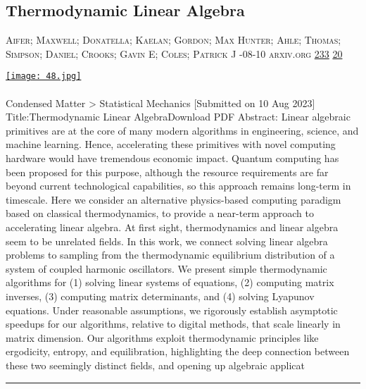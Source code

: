 \documentclass[10pt,a4paper]{article}
\begin{document}
\begin{multicols}{2}
\begin{minipage}{\linewidth}
\subsection{Thermodynamic Linear Algebra}
\textsc{\footnotesize
{\scriptsize\faUser}\space 
Aifer; Maxwell; Donatella; Kaelan; Gordon; Max Hunter; Ahle; Thomas; Simpson; Daniel; Crooks; Gavin E; Coles; Patrick J 
{\scriptsize\faCalendar}-08-10 
{\scriptsize\faGlobe}\space 
arxiv.org 
{\scriptsize\faThumbsOUp}\space 
\href{http://news.ycombinator.com/item?id=37106789\&utm\_term=comment}{233} 
{\scriptsize\faComments}\space 
\href{http://news.ycombinator.com/item?id=37106789\&utm\_term=comment}{20} 
}
\par\medskip\noindent
\href{https://arxiv.org/abs/2308.05660?utm\_source=hackernewsletter\&utm\_medium=email\&utm\_term=learn}{
    \texttt{[image: 48.jpg]}
}
\end{minipage}
\paragraph{}
Condensed Matter > Statistical Mechanics
[Submitted on 10 Aug 2023]
Title:Thermodynamic Linear AlgebraDownload PDF
Abstract: Linear algebraic primitives are at the core of many modern algorithms in engineering, science, and machine learning. Hence, accelerating these primitives with novel computing hardware would have tremendous economic impact. Quantum computing has been proposed for this purpose, although the resource requirements are far beyond current technological capabilities, so this approach remains long-term in timescale. Here we consider an alternative physics-based computing paradigm based on classical thermodynamics, to provide a near-term approach to accelerating linear algebra.
At first sight, thermodynamics and linear algebra seem to be unrelated fields. In this work, we connect solving linear algebra problems to sampling from the thermodynamic equilibrium distribution of a system of coupled harmonic oscillators. We present simple thermodynamic algorithms for (1) solving linear systems of equations, (2) computing matrix inverses, (3) computing matrix determinants, and (4) solving Lyapunov equations. Under reasonable assumptions, we rigorously establish asymptotic speedups for our algorithms, relative to digital methods, that scale linearly in matrix dimension. Our algorithms exploit thermodynamic principles like ergodicity, entropy, and equilibration, highlighting the deep connection between these two seemingly distinct fields, and opening up algebraic applicat
\par\noindent\textcolor{red}{\rule{\linewidth}{0.2mm}}
\vfill
\null
\noindent\begin{minipage}{\linewidth}

\end{minipage}
\end{multicols}
\end{document}
